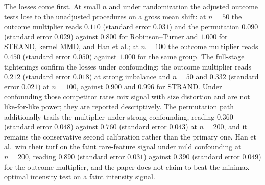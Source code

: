 The losses come first. At small $n$ and under randomization the adjusted outcome tests lose to the unadjusted procedures on a gross mean shift: at $n=50$ the outcome multiplier reads $0.110$ (standard error $0.031$) and the permutation $0.090$ (standard error $0.029$) against $0.800$ for Robinson--Turner and $1.000$ for STRAND, kernel MMD, and Han et al.; at $n=100$ the outcome multiplier reads $0.450$ (standard error $0.050$) against $1.000$ for the same group. The full-stage tightenings confirm the losses under confounding: the outcome multiplier reads $0.212$ (standard error $0.018$) at strong imbalance and $n=50$ and $0.332$ (standard error $0.021$) at $n=100$, against $0.900$ and $0.996$ for STRAND. Under confounding those competitor rates mix signal with size distortion and are not like-for-like power; they are reported descriptively. The permutation path additionally trails the multiplier under strong confounding, reading $0.360$ (standard error $0.048$) against $0.760$ (standard error $0.043$) at $n=200$, and it remains the conservative second calibration rather than the primary one. Han et al.\ win their turf on the faint rare-feature signal under mild confounding at $n=200$, reading $0.890$ (standard error $0.031$) against $0.390$ (standard error $0.049$) for the outcome multiplier, and the paper does not claim to beat the minimax-optimal intensity test on a faint intensity signal.

